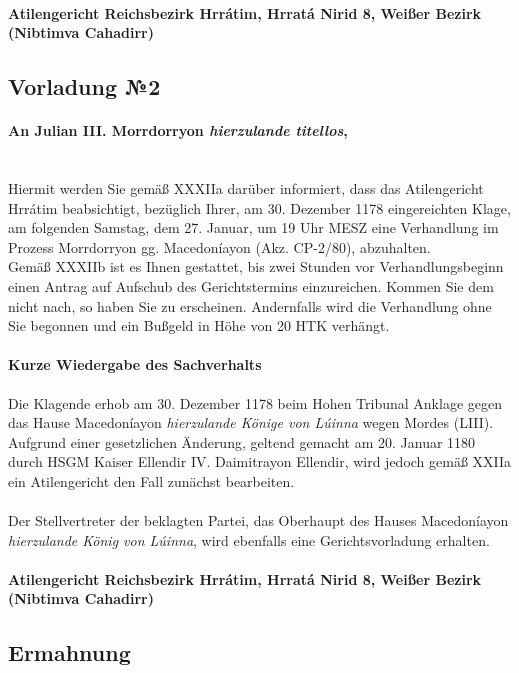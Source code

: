 \documentclass{article}
\begin{document}
\paragraph{Atilengericht Reichsbezirk Hrrátim, Hrratá Nirid 8, Weißer Bezirk (Nibtimva Cahadirr)}
\newpage
\subsection{Vorladung №2}
\paragraph{An Julian III. Morrdorryon \textit{hierzulande titellos},\\\\}
Hiermit werden Sie gemäß XXXIIa darüber informiert, dass das Atilengericht Hrrátim beabsichtigt, bezüglich Ihrer, 
am 30. Dezember 1178 eingereichten Klage, am folgenden Samstag, dem 27. Januar, um 19 Uhr MESZ eine Verhandlung im Prozess Morrdorryon gg.
Macedoníayon (Akz. CP-2/80), abzuhalten.\\
Gemäß XXXIIb ist es Ihnen gestattet, bis zwei Stunden vor Verhandlungsbeginn einen Antrag auf Aufschub des Gerichtstermins einzureichen.
Kommen Sie dem nicht nach, so haben Sie zu erscheinen. Andernfalls wird die Verhandlung ohne Sie begonnen und ein Bußgeld in Höhe von 20
HTK verhängt.
\paragraph{Kurze Wiedergabe des Sachverhalts\\}
Die Klagende erhob am 30. Dezember 1178 beim Hohen Tribunal Anklage gegen das Hause Macedoníayon \textit{hierzulande Könige von Lúinna} wegen Mordes
(LIII). Aufgrund einer gesetzlichen Änderung, geltend gemacht am 20. Januar 1180 durch HSGM Kaiser Ellendir IV. Daimitrayon Ellendir, wird jedoch gemäß 
XXIIa ein Atilengericht den Fall zunächst bearbeiten.\\\\
Der Stellvertreter der beklagten Partei, das Oberhaupt des Hauses Macedoníayon \textit{hierzulande König von Lúinna}, wird ebenfalls eine Gerichtsvorladung erhalten.\\

\paragraph{Atilengericht Reichsbezirk Hrrátim, Hrratá Nirid 8, Weißer Bezirk (Nibtimva Cahadirr)}
\subsection{Ermahnung}
\end{document}
